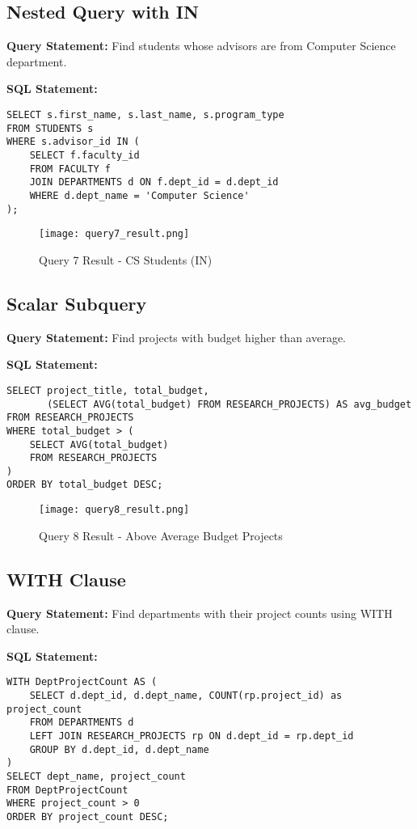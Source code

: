 \documentclass[12pt,a4paper]{article}
\begin{document}
\subsection{Nested Query with IN}
\textbf{Query Statement:} Find students whose advisors are from Computer Science department.

\textbf{SQL Statement:}
\begin{lstlisting}[style=sqlstyle]
SELECT s.first_name, s.last_name, s.program_type
FROM STUDENTS s
WHERE s.advisor_id IN (
    SELECT f.faculty_id
    FROM FACULTY f
    JOIN DEPARTMENTS d ON f.dept_id = d.dept_id
    WHERE d.dept_name = 'Computer Science'
);
\end{lstlisting}

\begin{figure}[H]
    \centering
    \texttt{[image: query7\_result.png]}
    \caption{Query 7 Result - CS Students (IN)}
\end{figure}

\subsection{Scalar Subquery}
\textbf{Query Statement:} Find projects with budget higher than average.

\textbf{SQL Statement:}
\begin{lstlisting}[style=sqlstyle]
SELECT project_title, total_budget,
       (SELECT AVG(total_budget) FROM RESEARCH_PROJECTS) AS avg_budget
FROM RESEARCH_PROJECTS
WHERE total_budget > (
    SELECT AVG(total_budget)
    FROM RESEARCH_PROJECTS
)
ORDER BY total_budget DESC;
\end{lstlisting}

\begin{figure}[H]
    \centering
    \texttt{[image: query8\_result.png]}
    \caption{Query 8 Result - Above Average Budget Projects}
\end{figure}

\subsection{WITH Clause}
\textbf{Query Statement:} Find departments with their project counts using WITH clause.

\textbf{SQL Statement:}
\begin{lstlisting}[style=sqlstyle]
WITH DeptProjectCount AS (
    SELECT d.dept_id, d.dept_name, COUNT(rp.project_id) as project_count
    FROM DEPARTMENTS d
    LEFT JOIN RESEARCH_PROJECTS rp ON d.dept_id = rp.dept_id
    GROUP BY d.dept_id, d.dept_name
)
SELECT dept_name, project_count
FROM DeptProjectCount
WHERE project_count > 0
ORDER BY project_count DESC;
\end{lstlisting}
\end{document}
